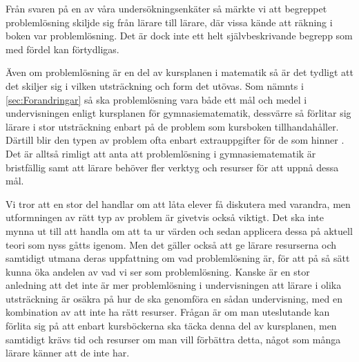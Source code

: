 
\textcolor{Mahogany}{
    Från svaren på en av våra undersökningsenkäter så märkte vi att begreppet problemlösning skiljde sig från lärare till lärare, där vissa kände att räkning i boken var problemlösning. Det är dock inte ett helt självbeskrivande begrepp som med fördel kan förtydligas.
}

\textcolor{Mahogany}{
    Även om problemlösning är en del av kursplanen i matematik så är det tydligt att det skiljer sig i vilken utsträckning och form det utövas. Som nämnts i \ref{sec:Forandringar} så ska problemlösning vara både ett mål och medel i undervisningen enligt kursplanen för gymnasiematematik, dessvärre så förlitar sig lärare i stor utsträckning enbart på de problem som kursboken tillhandahåller. Därtill blir den typen av problem ofta enbart extrauppgifter för de som hinner \cite{2010UndervisningenGymnasieskolan}. Det är alltså rimligt att anta att problemlösning i gymnasiematematik är bristfällig samt att lärare behöver fler verktyg och resurser för att uppnå dessa mål.
}

\textcolor{Mahogany}{
    Vi tror att en stor del handlar om att låta elever få diskutera med varandra, men utformningen av rätt typ av problem är givetvis också viktigt. Det ska inte mynna ut till att handla om att ta ur värden och sedan applicera dessa på aktuell teori som nyss gåtts igenom. Men det gäller också att ge lärare resurserna och samtidigt utmana deras uppfattning om vad problemlösning är, för att på så sätt kunna öka andelen av vad vi ser som problemlösning.
    Kanske är en stor anledning att det inte är mer problemlösning i undervisningen att lärare i olika utsträckning är osäkra på hur de ska genomföra en sådan undervisning, med en kombination av att inte ha rätt resurser. Frågan är om man uteslutande kan förlita sig på att enbart kursböckerna ska täcka denna del av kursplanen, men samtidigt krävs tid och resurser om man vill förbättra detta, något som många lärare känner att de inte har.
}